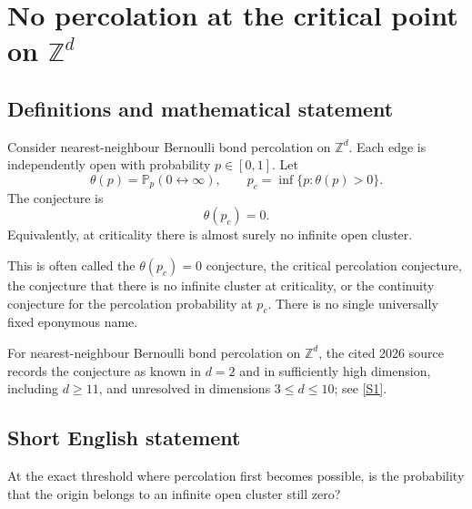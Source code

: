 \documentclass[11pt]{article}
\begin{document}
\section*{\texorpdfstring{No percolation at the critical point on $\mathbb{Z}^d$}{No percolation at the critical point on \$\textbackslash{}mathbb\{Z\}\textasciicircum{}d\$}}\label{critical-percolation}\label{10100001}

\subsection{Definitions and mathematical statement}
Consider nearest-neighbour Bernoulli bond percolation on \(\mathbb Z^d\). Each edge is independently open with probability \(p\in[0,1]\). Let
\[
\theta(p)=\mathbb P_p(0\leftrightarrow\infty),
\qquad
p_c=\inf\{p:\theta(p)>0\}.
\]
The conjecture is
\[
\boxed{\theta(p_c)=0.}
\]
Equivalently, at criticality there is almost surely no infinite open cluster.

This is often called the \(\theta(p_c)=0\) conjecture, the critical percolation conjecture, the conjecture that there is no infinite cluster at criticality, or the continuity conjecture for the percolation probability at \(p_c\). There is no single universally fixed eponymous name.

For nearest-neighbour Bernoulli bond percolation on \(\mathbb Z^d\), the cited 2026 source records the conjecture as known in \(d=2\) and in sufficiently high dimension, including \(d\ge11\), and unresolved in dimensions \(3\le d\le10\); see \href{https://arxiv.org/html/2608.23661v1}{[S1]}.

\subsection{Short English statement}
At the exact threshold where percolation first becomes possible, is the probability that the origin belongs to an infinite open cluster still zero?
\end{document}
